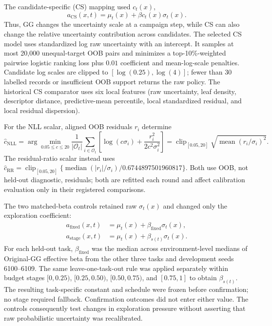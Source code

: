 \documentclass[10pt]{article}
\begin{document}
The candidate-specific (CS) mapping used $c_t(x)$,
\begin{equation}
a_{\mathrm{CS}}(x,t)=\mu_t(x)+\beta c_t(x)\sigma_t(x).
\end{equation}
Thus, GG changes the uncertainty scale at a campaign step, while CS can also
change the relative uncertainty contribution across candidates. The selected
CS model uses standardized log raw uncertainty with an intercept. It samples
at most 20,000 unequal-target OOB pairs and minimizes a top-10\%-weighted
pairwise logistic ranking loss plus $0.01$ coefficient and mean-log-scale
penalties. Candidate log scales are clipped to
$[\log(0.25),\log(4)]$; fewer than 30 labelled records or insufficient OOB
support returns the raw policy. The historical CS comparator uses six local
features (raw uncertainty, leaf density, descriptor distance, predictive-mean
percentile, local standardized residual, and local residual dispersion).

For the NLL scalar, aligned OOB residuals $r_i$ determine
\begin{equation}
\hat c_{\mathrm{NLL}}=\arg\min_{0.05\le c\le20}
\frac{1}{|\mathcal O_t|}\sum_{i\in\mathcal O_t}
\left[\log(c\sigma_i)+\frac{r_i^2}{2c^2\sigma_i^2}\right]
=\operatorname{clip}_{[0.05,20]}
\sqrt{\operatorname{mean}(r_i/\sigma_i)^2}.
\end{equation}
The residual-ratio scalar instead uses
$\hat c_{\mathrm{RR}}=\operatorname{clip}_{[0.05,20]}
\{\operatorname{median}(|r_i|/\sigma_i)/0.6744897501960817\}$.
Both use OOB, not held-out diagnostic, residuals; both are refitted each round
and affect calibration evaluation only in their registered comparisons.

The two matched-beta controls retained raw $\sigma_t(x)$ and changed only the
exploration coefficient:
\begin{align}
a_{\mathrm{fixed}}(x,t) &=
\mu_t(x)+\beta_{\mathrm{fixed}}\sigma_t(x),\\
a_{\mathrm{stage}}(x,t) &=
\mu_t(x)+\beta_{s(t)}\sigma_t(x).
\end{align}
For each held-out task, $\beta_{\mathrm{fixed}}$ was the median across
environment-level medians of Original-GG effective beta from the other three
tasks and development seeds 6100--6109. The same leave-one-task-out rule was
applied separately within budget stages $[0,0.25)$, $[0.25,0.50)$,
$[0.50,0.75)$, and $[0.75,1]$ to obtain $\beta_{s(t)}$. The resulting
task-specific constant and schedule were frozen before confirmation; no stage
required fallback. Confirmation outcomes did not enter either value. The
controls consequently test changes in exploration pressure without asserting
that raw probabilistic uncertainty was recalibrated.
\end{document}
